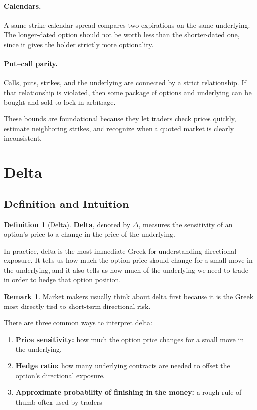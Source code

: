 \documentclass[11pt]{article}
\theoremstyle{definition}
\newtheorem{definition}{Definition}[section]
\newtheorem{remark}{Remark}[section]
\begin{document}
\paragraph{Calendars.}
A same-strike calendar spread compares two expirations on the same underlying. The longer-dated option should not be worth less than the shorter-dated one, since it gives the holder strictly more optionality.

\paragraph{Put--call parity.}
Calls, puts, strikes, and the underlying are connected by a strict relationship. If that relationship is violated, then some package of options and underlying can be bought and sold to lock in arbitrage.


These bounds are foundational because they let traders check prices quickly, estimate neighboring strikes, and recognize when a quoted market is clearly inconsistent.

\section{Delta}

\subsection{Definition and Intuition}

\begin{definition}[Delta]
\textbf{Delta}, denoted by \(\Delta\), measures the sensitivity of an option's price to a change in the price of the underlying.
\end{definition}

In practice, delta is the most immediate Greek for understanding directional exposure. It tells us how much the option price should change for a small move in the underlying, and it also tells us how much of the underlying we need to trade in order to hedge that option position.

\begin{remark}
Market makers usually think about delta first because it is the Greek most directly tied to short-term directional risk.
\end{remark}

There are three common ways to interpret delta:

\begin{enumerate}[leftmargin=2em]
    \item \textbf{Price sensitivity:} how much the option price changes for a small move in the underlying.
    \item \textbf{Hedge ratio:} how many underlying contracts are needed to offset the option's directional exposure.
    \item \textbf{Approximate probability of finishing in the money:} a rough rule of thumb often used by traders.
\end{enumerate}
\end{document}
